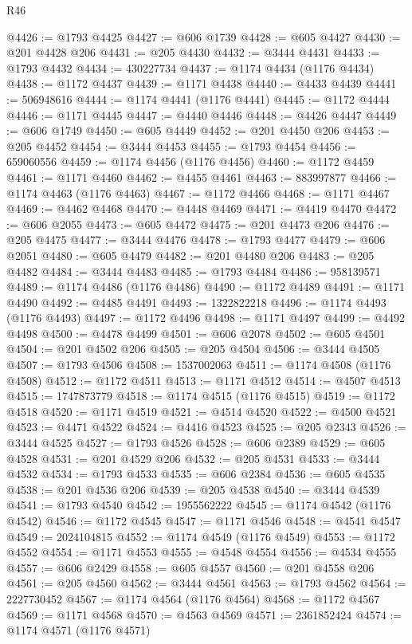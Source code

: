 \begin{lexlean}{R46}
\begin{coremodule}
@4426 := @1793 @4425
@4427 := @606 @1739
@4428 := @605 @4427
@4430 := @201 @4428 @206
@4431 := @205 @4430
@4432 := @3444 @4431
@4433 := @1793 @4432
@4434 := 430227734
@4437 := @1174 @4434 (@1176 @4434)
@4438 := @1172 @4437
@4439 := @1171 @4438
@4440 := @4433 @4439
@4441 := 506948616
@4444 := @1174 @4441 (@1176 @4441)
@4445 := @1172 @4444
@4446 := @1171 @4445
@4447 := @4440 @4446
@4448 := @4426 @4447
@4449 := @606 @1749
@4450 := @605 @4449
@4452 := @201 @4450 @206
@4453 := @205 @4452
@4454 := @3444 @4453
@4455 := @1793 @4454
@4456 := 659060556
@4459 := @1174 @4456 (@1176 @4456)
@4460 := @1172 @4459
@4461 := @1171 @4460
@4462 := @4455 @4461
@4463 := 883997877
@4466 := @1174 @4463 (@1176 @4463)
@4467 := @1172 @4466
@4468 := @1171 @4467
@4469 := @4462 @4468
@4470 := @4448 @4469
@4471 := @4419 @4470
@4472 := @606 @2055
@4473 := @605 @4472
@4475 := @201 @4473 @206
@4476 := @205 @4475
@4477 := @3444 @4476
@4478 := @1793 @4477
@4479 := @606 @2051
@4480 := @605 @4479
@4482 := @201 @4480 @206
@4483 := @205 @4482
@4484 := @3444 @4483
@4485 := @1793 @4484
@4486 := 958139571
@4489 := @1174 @4486 (@1176 @4486)
@4490 := @1172 @4489
@4491 := @1171 @4490
@4492 := @4485 @4491
@4493 := 1322822218
@4496 := @1174 @4493 (@1176 @4493)
@4497 := @1172 @4496
@4498 := @1171 @4497
@4499 := @4492 @4498
@4500 := @4478 @4499
@4501 := @606 @2078
@4502 := @605 @4501
@4504 := @201 @4502 @206
@4505 := @205 @4504
@4506 := @3444 @4505
@4507 := @1793 @4506
@4508 := 1537002063
@4511 := @1174 @4508 (@1176 @4508)
@4512 := @1172 @4511
@4513 := @1171 @4512
@4514 := @4507 @4513
@4515 := 1747873779
@4518 := @1174 @4515 (@1176 @4515)
@4519 := @1172 @4518
@4520 := @1171 @4519
@4521 := @4514 @4520
@4522 := @4500 @4521
@4523 := @4471 @4522
@4524 := @4416 @4523
@4525 := @205 @2343
@4526 := @3444 @4525
@4527 := @1793 @4526
@4528 := @606 @2389
@4529 := @605 @4528
@4531 := @201 @4529 @206
@4532 := @205 @4531
@4533 := @3444 @4532
@4534 := @1793 @4533
@4535 := @606 @2384
@4536 := @605 @4535
@4538 := @201 @4536 @206
@4539 := @205 @4538
@4540 := @3444 @4539
@4541 := @1793 @4540
@4542 := 1955562222
@4545 := @1174 @4542 (@1176 @4542)
@4546 := @1172 @4545
@4547 := @1171 @4546
@4548 := @4541 @4547
@4549 := 2024104815
@4552 := @1174 @4549 (@1176 @4549)
@4553 := @1172 @4552
@4554 := @1171 @4553
@4555 := @4548 @4554
@4556 := @4534 @4555
@4557 := @606 @2429
@4558 := @605 @4557
@4560 := @201 @4558 @206
@4561 := @205 @4560
@4562 := @3444 @4561
@4563 := @1793 @4562
@4564 := 2227730452
@4567 := @1174 @4564 (@1176 @4564)
@4568 := @1172 @4567
@4569 := @1171 @4568
@4570 := @4563 @4569
@4571 := 2361852424
@4574 := @1174 @4571 (@1176 @4571)

\end{coremodule}
\end{lexlean}
